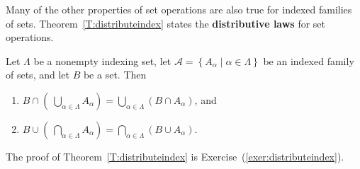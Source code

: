 Many of the other properties of set operations are also true for indexed families of sets.  Theorem~\ref{T:distributeindex} states the \textbf{distributive laws}
%
%
 for set operations.

\begin{theorem} \label{T:distributeindex}
Let $\Lambda$ be a nonempty indexing set, let 
$\mathscr{A} = \left\{ A_\alpha \mid \alpha \in \Lambda \right\}$ be an indexed family of sets, and let $B$ be a set.  Then
\begin{enumerate}
\item $B \cap \left(\:\bigcup\limits_{\alpha \in \Lambda}^{}A_{\alpha} \right) 
= \bigcup\limits_{\alpha \in \Lambda}^{} \left( B \cap A_{\alpha} \right)$, and
\item $B \cup \left(\:\bigcap\limits_{\alpha \in \Lambda}^{}A_{\alpha} \right) 
= \bigcap\limits_{\alpha \in \Lambda}^{} \left( B \cup A_{\alpha} \right)$.
\end{enumerate}
\end{theorem}

\noindent
The proof of Theorem~\ref{T:distributeindex} is Exercise~(\ref{exer:distributeindex}).

\endinput

